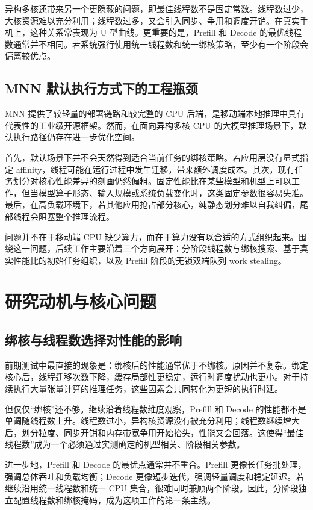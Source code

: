 异构多核还带来另一个更隐蔽的问题，即最佳线程数不是固定常数。线程数过少，大核资源难以充分利用；线程数过多，又会引入同步、争用和调度开销。在真实手机上，这种关系常表现为 U 型曲线。更重要的是，Prefill 和 Decode 的最优线程数通常并不相同。若系统强行使用统一线程数和统一绑核策略，至少有一个阶段会偏离较优点。

\subsection{MNN 默认执行方式下的工程瓶颈}

MNN 提供了较轻量的部署链路和较完整的 CPU 后端，是移动端本地推理中具有代表性的工业级开源框架\cite{jiang2020mnn}。然而，在面向异构多核 CPU 的大模型推理场景下，默认执行路径仍存在进一步优化空间。

首先，默认场景下并不会天然得到适合当前任务的绑核策略。若应用层没有显式指定 affinity，线程可能在运行过程中发生迁移，带来额外调度成本。其次，现有任务划分对核心性能差异的刻画仍然偏粗。固定性能比在某些模型和机型上可以工作，但当模型算子形态、输入规模或系统负载变化时，这类固定参数很容易失准。最后，在高负载环境下，若其他应用抢占部分核心，纯静态划分难以自我纠偏，尾部线程会阻塞整个推理流程。

问题并不在于移动端 CPU 缺少算力，而在于算力没有以合适的方式组织起来。围绕这一问题，后续工作主要沿着三个方向展开：分阶段线程数与绑核搜索、基于真实性能比的初始任务组织，以及 Prefill 阶段的无锁双端队列 work stealing。

\section{研究动机与核心问题}

\subsection{绑核与线程数选择对性能的影响}

前期测试中最直接的现象是：绑核后的性能通常优于不绑核。原因并不复杂。绑定核心后，线程迁移次数下降，缓存局部性更稳定，运行时调度扰动也更小。对于持续执行大量张量计算的推理任务，这些因素会共同转化为更短的执行时延。

但仅仅“绑核”还不够。继续沿着线程数维度观察，Prefill 和 Decode 的性能都不是单调随线程数上升。线程数过小，异构核资源没有被充分利用；线程数继续增大后，划分粒度、同步开销和内存带宽争用开始抬头，性能又会回落。这使得“最佳线程数”成为一个必须通过实测确定的机型相关、阶段相关参数。

进一步地，Prefill 和 Decode 的最优点通常并不重合。Prefill 更像长任务批处理，强调总体吞吐和负载均衡；Decode 更像短步迭代，强调轻量调度和稳定延迟。若继续沿用统一线程数和统一 CPU 集合，很难同时兼顾两个阶段。因此，分阶段独立配置线程数和绑核掩码，成为这项工作的第一条主线。

